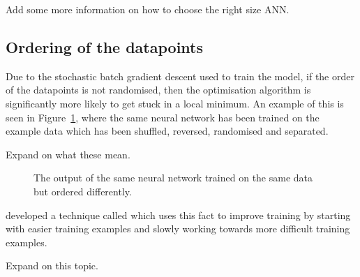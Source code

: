 \begin{todo}
	Add some more information on how to choose the right size ANN.
\end{todo}

\subsection{Ordering of the datapoints}

Due to the stochastic batch gradient descent used to train the model, if the order of the datapoints is not randomised, then the optimisation algorithm is significantly more likely to get stuck in a local minimum.
An example of this is seen in Figure~\ref{fig:compare-order}, where the same neural network has been trained on the example data which has been shuffled, reversed, randomised and separated.

\begin{todo}
	Expand on what these mean.
\end{todo}

\begin{figure}[htbp]
	\centering
	
	\caption{The output of the same neural network trained on the same data but ordered differently.}
	\label{fig:compare-order}
\end{figure}

\textcite{bengio2009} developed a technique called  which uses this fact to improve training by starting with easier training examples and slowly working towards more difficult training examples.

\begin{todo}
	Expand on this topic.
\end{todo}
